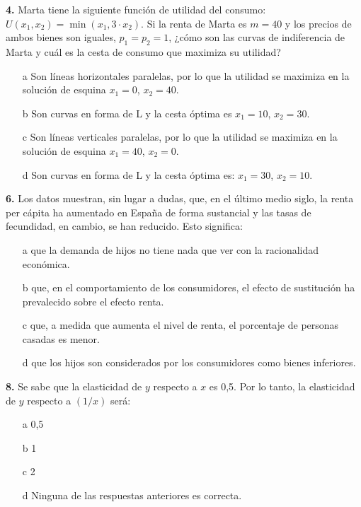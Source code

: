 \documentclass{nuevotema}
\begin{document}
\textbf{4.} Marta tiene la siguiente función de utilidad del consumo: $U(x_1,x_2) = \min (x_1, 3\cdot x_2)$. Si la renta de Marta es $m=40$ y los precios de ambos bienes son iguales, $p_1=p_2=1$, ¿cómo son las curvas de indiferencia de Marta y cuál es la cesta de consumo que maximiza su utilidad?

\begin{itemize}
	\item[a] Son líneas horizontales paralelas, por lo que la utilidad se maximiza en la solución de esquina $x_1 = 0$, $x_2 = 40$.
	\item[b] Son curvas en forma de L y la cesta óptima es $x_1 = 10$, $x_2=30$.
	\item[c] Son líneas verticales paralelas, por lo que la utilidad se maximiza en la solución de esquina $x_1 = 40$, $x_2 = 0$.
	\item[d] Son curvas en forma de L y la cesta óptima es: $x_1 = 30$, $x_2 = 10$.
\end{itemize}

\textbf{6.} Los datos muestran, sin lugar a dudas, que, en el último medio siglo, la renta per cápita ha aumentado en España de forma sustancial y las tasas de fecundidad, en cambio, se han reducido. Esto significa:
\begin{enumerate}
    \item[a] que la demanda de hijos no tiene nada que ver con la racionalidad económica.
    \item[b] que, en el comportamiento de los consumidores, el efecto de sustitución ha prevalecido sobre el efecto renta.
    \item[c] que, a medida que aumenta el nivel de renta, el porcentaje de personas casadas es menor.
    \item[d] que los hijos son considerados por los consumidores como bienes inferiores.
\end{enumerate}

\textbf{8.} Se sabe que la elasticidad de $y$ respecto a $x$ es 0,5. Por lo tanto, la elasticidad de $y$ respecto a $(1/x)$ será:
\begin{enumerate}
    \item[a] 0,5
    \item[b] 1
    \item[c] 2
    \item[d] Ninguna de las respuestas anteriores es correcta.
\end{enumerate}
\end{document}
